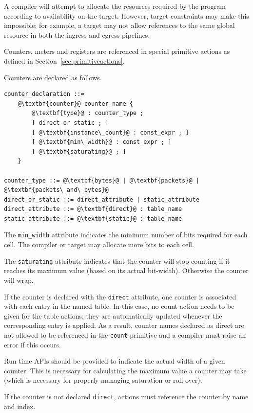 \documentclass[12pt]{article}
\begin{document}
A compiler will attempt to allocate the resources required by the program
according to availability on the target. However, target constraints may make
this impossible; for example, a target may not allow references to the same
global resource in both the ingress and egress pipelines.

Counters, meters and registers are referenced in special primitive actions as defined
in Section~\ref{sec:primitiveactions}.


Counters are declared as follows.

\begin{lstlisting}[frame=single,backgroundcolor=\color{bnfgreen},escapechar=\@]
counter_declaration ::=
    @\textbf{counter}@ counter_name {
        @\textbf{type}@ : counter_type ;
        [ direct_or_static ; ]
        [ @\textbf{instance\_count}@ : const_expr ; ]
        [ @\textbf{min\_width}@ : const_expr ; ]
        [ @\textbf{saturating}@ ; ]
    }

counter_type ::= @\textbf{bytes}@ | @\textbf{packets}@ | @\textbf{packets\_and\_bytes}@
direct_or_static ::= direct_attribute | static_attribute
direct_attribute ::= @\textbf{direct}@ : table_name
static_attribute ::= @\textbf{static}@ : table_name
\end{lstlisting}


The \texttt{min_width} attribute indicates the minimum number of bits
required for each cell.  The compiler or target may allocate more bits
to each cell.

The \texttt{saturating} attribute indicates that the counter will stop
counting if it reaches its maximum value (based on its actual
bit-width). Otherwise the counter will wrap.

If the counter is declared with the \texttt{direct} attribute, one
counter is associated with each entry in the named table. In this
case, no count action needs to be given for the table actions; they
are automatically updated whenever the corresponding entry is
applied. As a result, counter names declared as direct are not allowed
to be referenced in the \texttt{count} primitive and a compiler must
raise an error if this occurs.

Run time APIs should be provided to indicate the actual width of a
given counter.  This is necessary for calculating the maximum value a
counter may take (which is necessary for properly managing saturation
or roll over).

If the counter is not declared \texttt{direct}, actions must reference
the counter by name and index.
\end{document}

